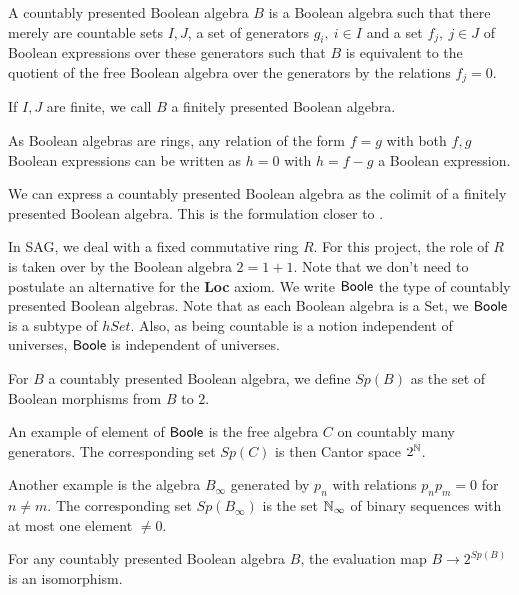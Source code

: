 \newcommand{\isSt}{\mathsf{isStone}}


\begin{definition}
  A countably presented Boolean algebra $B$ is a Boolean algebra such that there merely are 
  countable sets $I,J$, 
  a set of generators $g_i,~{i\in I}$ and a set $f_j,~{j\in J}$ of Boolean expressions over these generators 
  such that $B$ is equivalent to the quotient of the free Boolean algebra over the generators by the relations
  $f_j=0$. 
\end{definition} 
If $I,J$ are finite, we call $B$ a finitely presented Boolean algebra. 

\begin{remark}
  As Boolean algebras are rings, any relation of the form $f=g$ with both $f,g$ Boolean expressions 
  can be written as $h=0$ with $h=f-g$ a Boolean expression. 
\end{remark} 
We can express a countably presented Boolean algebra as the colimit of a finitely presented Boolean algebra. 
This is the formulation closer to \cite{Scholze}.



\medskip

In SAG, we deal with a fixed commutative ring $R$. For this project, the role of $R$ is taken over by 
the Boolean algebra $2 = 1+1$. Note that we don't need to postulate an alternative for the \textbf{Loc} axiom. 
We write $\mathsf{Boole}$ the type of countably presented Boolean algebras.
Note that as each Boolean algebra is a Set, we $\mathsf{Boole}$ is a subtype of $hSet$.
Also, as being countable is a notion independent of universes, $\mathsf{Boole}$ is independent of universes.

\medskip

\begin{definition}
  For $B$ a countably presented Boolean algebra, we define $Sp(B)$ as the set of Boolean morphisms from $B$ to $2$. 
\end{definition}

\medskip

An example of element of $\mathsf{Boole}$ is the free algebra $C$ on countably many generators. The corresponding set $Sp(C)$
is then Cantor space $2^{\mathbb{N}}$.

Another example is the algebra $B_{\infty}$ generated by $p_n$ with relations $p_np_m = 0$ for $n\neq m$. The corresponding
set $Sp(B_{\infty})$ is the set $\mathbb{N}_{\infty}$ of binary sequences with at most one element $\neq 0$.

\begin{axiom}
  For any countably presented Boolean algebra $B$, the evaluation map   $B\rightarrow  2^{Sp(B)}$ is an isomorphism.
\end{axiom} 

